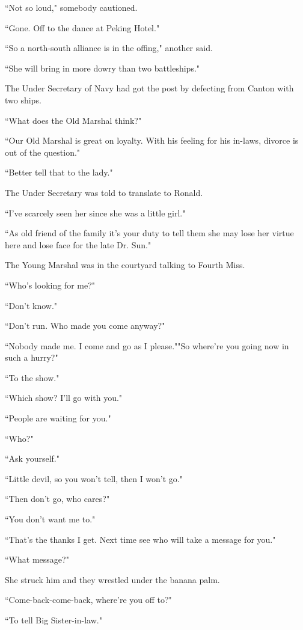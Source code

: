 \par ``Not so loud," somebody cautioned.
\par ``Gone. Off to the dance at Peking Hotel."
\par ``So a north-south alliance is in the offing," another said.
\par ``She will bring in more dowry than two battleships."
\par The Under Secretary of Navy had got the post by defecting from Canton with two ships.
\par ``What does the Old Marshal think?"
\par ``Our Old Marshal is great on loyalty. With his feeling for his in-laws, divorce is out of the question."
\par ``Better tell that to the lady."
\par The Under Secretary was told to translate to Ronald.
\par ``I've scarcely seen her since she was a little girl."
\par ``As old friend of the family it's your duty to tell them she may lose her virtue here and lose face for the late Dr. Sun."
\par The Young Marshal was in the courtyard talking to Fourth Miss.
\par ``Who's looking for me?"
\par ``Don't know."
\par ``Don't run. Who made you come anyway?"
\par ``Nobody made me. I come and go as I please.""So where're you going now in such a hurry?"
\par ``To the show."
\par ``Which show? I'll go with you."
\par ``People are waiting for you."
\par ``Who?"
\par ``Ask yourself."
\par ``Little devil, so you won't tell, then I won't go."
\par ``Then don't go, who cares?"
\par ``You don't want me to."
\par ``That's the thanks I get. Next time see who will take a message for you."
\par ``What message?"
\par She struck him and they wrestled under the banana palm.
\par ``Come-back-come-back, where're you off to?"
\par ``To tell Big Sister-in-law."
